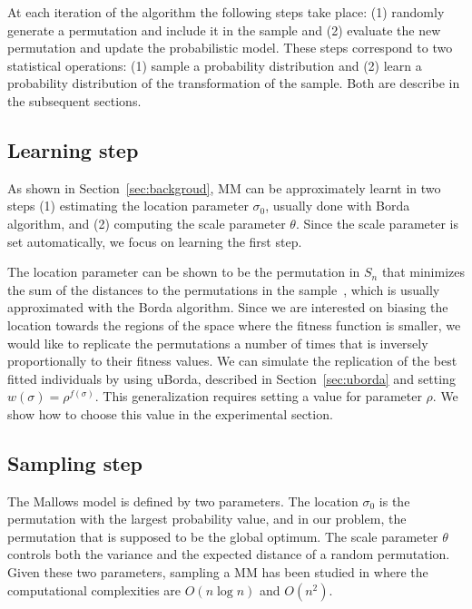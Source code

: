 \documentclass[runningheads]{llncs}
\begin{document}
At each iteration of the algorithm the following steps take place: (1) randomly generate a permutation and include it in the sample and (2) evaluate the new permutation and update the probabilistic model. These steps correspond to two statistical operations: (1) sample a probability distribution and (2) learn a probability distribution of the transformation of the sample. Both are describe in the subsequent sections. 

\subsection{Learning step}\label{sec:learning}

As shown in Section~\ref{sec:backgroud}, MM can be approximately learnt in two steps (1) estimating the location parameter $\sigma_0$, usually done with Borda algorithm, and (2) computing the scale parameter $\theta$. Since the scale parameter is set automatically, we focus on learning the first step. 

The location parameter can be shown to be the permutation in $S_n$ that minimizes the sum of the distances to the permutations in the sample~\cite{gMallows}, which is usually approximated with the Borda algorithm. Since we are interested on biasing the location towards the regions of the space where the fitness function is smaller, we would like to replicate the permutations a number of times that is inversely proportionally to their fitness values.
We can simulate the replication of the best fitted individuals by using uBorda, described in Section~\ref{sec:uborda} and setting $w(\sigma)=\rho^{f(\sigma)}$. This generalization requires setting a value for parameter $\rho$. We show how to choose this value in the experimental section. 


\subsection{Sampling step}
The Mallows model is defined by two parameters. The location $\sigma_0$ is the permutation with the largest probability value, and in our problem, the permutation that is supposed to be the global optimum. The scale parameter $\theta$ controls both the variance and the expected distance of a random permutation. Given these two parameters, sampling a MM has been studied in \cite{Collas}\cite{Irurozki2016b}\cite{Regenwetter2004} where the computational complexities are $O(n\log n)$ and $O(n^2)$.
\end{document}
